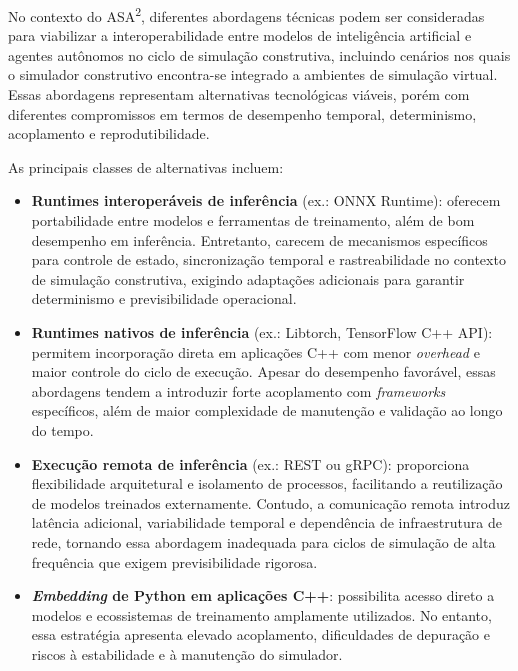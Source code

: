 No contexto do ASA\textsuperscript{2}, diferentes abordagens técnicas podem ser consideradas para viabilizar a interoperabilidade entre modelos de inteligência artificial e agentes autônomos no ciclo de simulação construtiva, incluindo cenários nos quais o simulador construtivo encontra-se integrado a ambientes de simulação virtual. Essas abordagens representam alternativas tecnológicas viáveis, porém com diferentes compromissos em termos de desempenho temporal, determinismo, acoplamento e reprodutibilidade.

As principais classes de alternativas incluem:

\begin{itemize}
    \item \textbf{Runtimes interoperáveis de inferência} (ex.: ONNX Runtime): oferecem portabilidade entre modelos e ferramentas de treinamento, além de bom desempenho em inferência. Entretanto, carecem de mecanismos específicos para controle de estado, sincronização temporal e rastreabilidade no contexto de simulação construtiva, exigindo adaptações adicionais para garantir determinismo e previsibilidade operacional.

    \item \textbf{Runtimes nativos de inferência} (ex.: Libtorch, TensorFlow C++ API): permitem incorporação direta em aplicações C++ com menor \emph{overhead} e maior controle do ciclo de execução. Apesar do desempenho favorável, essas abordagens tendem a introduzir forte acoplamento com \emph{frameworks} específicos, além de maior complexidade de manutenção e validação ao longo do tempo.

    \item \textbf{Execução remota de inferência} (ex.: REST ou gRPC): proporciona flexibilidade arquitetural e isolamento de processos, facilitando a reutilização de modelos treinados externamente. Contudo, a comunicação remota introduz latência adicional, variabilidade temporal e dependência de infraestrutura de rede, tornando essa abordagem inadequada para ciclos de simulação de alta frequência que exigem previsibilidade rigorosa.

    \item \textbf{\emph{Embedding} de Python em aplicações C++}: possibilita acesso direto a modelos e ecossistemas de treinamento amplamente utilizados. No entanto, essa estratégia apresenta elevado acoplamento, dificuldades de depuração e riscos à estabilidade e à manutenção do simulador.
\end{itemize}

